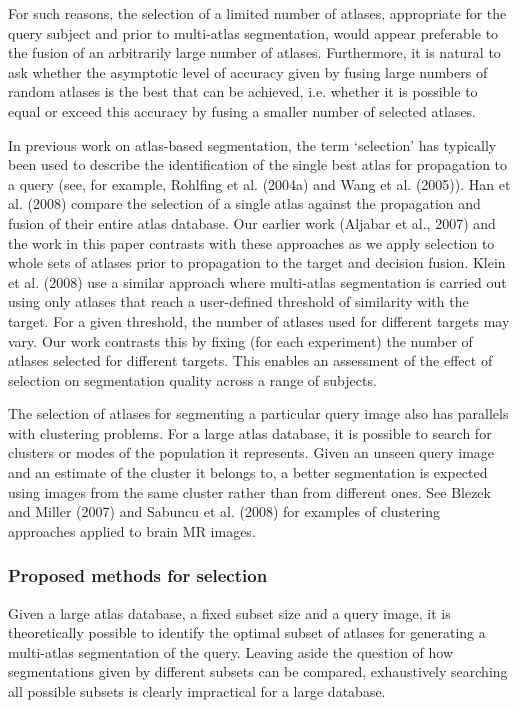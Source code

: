 For such reasons, the selection of a limited number of atlases,
appropriate for the query subject and prior to multi-atlas segmentation,
would appear preferable to the fusion of
an arbitrarily large number of atlases.
Furthermore, it is natural to ask
whether the asymptotic level of accuracy given by
fusing large numbers of random atlases is the best that can be achieved,
i.e. whether it is possible to equal or exceed this accuracy
by fusing a smaller number of selected atlases.

In previous work on atlas-based segmentation,
the term `selection' has typically been used to describe
the identification of the single best atlas for propagation to a query
(see, for example, Rohlfing et al. (2004a) and Wang et al. (2005)).
Han et al. (2008)
compare the selection of a single atlas against
the propagation and fusion of their entire atlas database.
Our earlier work (Aljabar et al., 2007) and
the work in this paper contrasts with these approaches
as we apply selection to whole sets of atlases prior
to propagation to the target and decision fusion.
Klein et al. (2008) use a similar approach
where multi-atlas segmentation is carried out
using only atlases that reach a user-defined threshold of similarity
with the target.
For a given threshold, the number of atlases used for different targets
may vary.
Our work contrasts this by fixing (for each experiment) the number of atlases
selected for different targets.
This enables an assessment of the effect of selection on segmentation quality
across a range of subjects.

The selection of atlases for segmenting a particular query image
also has parallels with clustering problems. For a large atlas database,
it is possible to search for clusters or modes of the population it
represents. Given an unseen query image and an estimate of the
cluster it belongs to, a better segmentation is expected using images
from the same cluster rather than from different ones. See Blezek and
Miller (2007) and Sabuncu et al. (2008) for examples of clustering
approaches applied to brain MR images.


\subsubsection*{Proposed methods for selection}
Given a large atlas database, a fixed subset size and a query image,
it is theoretically possible to identify the optimal subset of atlases for
generating a multi-atlas segmentation of the query. Leaving aside the
question of how segmentations given by different subsets can be
compared, exhaustively searching all possible subsets is clearly
impractical for a large database.

